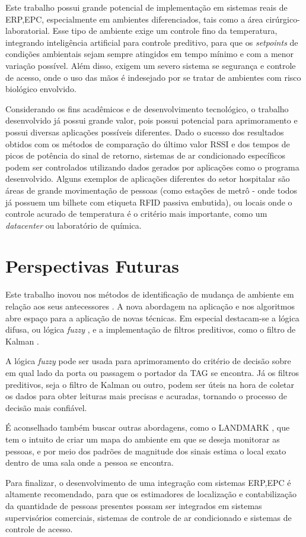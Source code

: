 Este trabalho possui grande potencial de implementação em sistemas reais de ERP,EPC, especialmente em ambientes diferenciados, tais como a área cirúrgico-laboratorial. Esse tipo de ambiente exige um controle fino da temperatura, integrando inteligência artificial para controle preditivo, para que os \textit{setpoints} de condições ambientais sejam sempre atingidos em tempo mínimo e com a menor variação possível. Além disso, exigem um severo sistema se segurança e controle de acesso, onde o uso das mãos é indesejado por se tratar de ambientes com risco biológico envolvido.

Considerando os fins acadêmicos e de desenvolvimento tecnológico, o trabalho desenvolvido já possui grande valor, pois possui potencial para aprimoramento e possui diversas aplicações possíveis diferentes. Dado o sucesso dos resultados obtidos com os métodos de comparação do último valor RSSI e dos tempos de picos de potência do sinal de retorno, sistemas de ar condicionado específicos podem ser controlados utilizando dados gerados por aplicações como o programa desenvolvido. Alguns exemplos de aplicações diferentes do setor hospitalar são áreas de grande movimentação de pessoas (como estações de metrô - onde todos já possuem um bilhete com etiqueta RFID passiva embutida), ou locais onde o controle acurado de temperatura é o critério mais importante, como um \textit{datacenter} ou laboratório de química.


\section{Perspectivas Futuras}

Este trabalho inovou nos métodos de identificação de mudança de ambiente em relação aos seus antecessores \cite{TG2013OliveiraERocha} \cite{TG2015RaissaERenata}. A nova abordagem na aplicação e nos algoritmos abre espaço para a aplicação de novas técnicas. Em especial destacam-se a lógica difusa, ou lógica \textit{fuzzy} \cite{yen1999fuzzy}, e a implementação de filtros preditivos, como o filtro de Kalman \cite{welch1995introduction}.

A lógica \textit{fuzzy} pode ser usada para aprimoramento do critério de decisão sobre em qual lado da porta ou passagem o portador da TAG se encontra. Já os filtros preditivos, seja o filtro de Kalman ou outro, podem ser úteis na hora de coletar os dados para obter leituras mais precisas e acuradas, tornando o processo de decisão mais confiável.

É aconselhado também buscar outras abordagens, como o LANDMARK \cite{bekkali2007rfid}, que tem o intuito de criar um mapa do ambiente em que se deseja monitorar as pessoas, e por meio dos padrões de magnitude dos sinais estima o local exato dentro de uma sala onde a pessoa se encontra.

Para finalizar, o desenvolvimento de uma integração com sistemas ERP,EPC é altamente recomendado, para que os estimadores de localização e contabilização da quantidade de pessoas presentes possam ser integrados em sistemas supervisórios comerciais, sistemas de controle de ar condicionado e sistemas de controle de acesso.